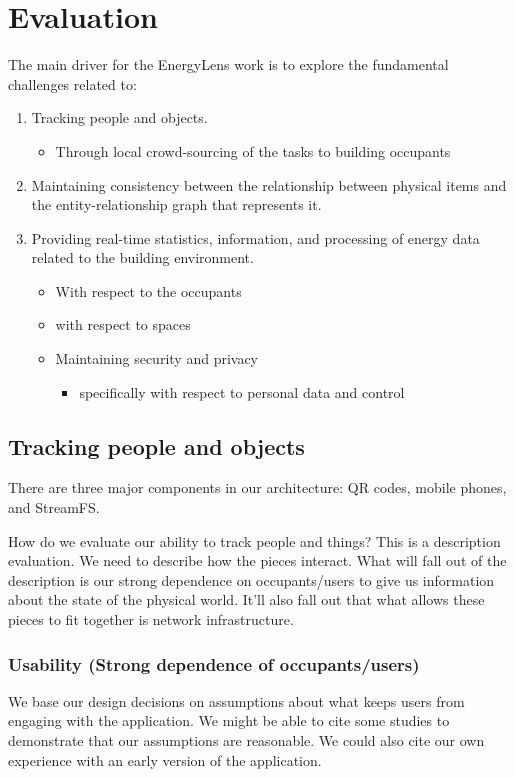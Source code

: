 \section{Evaluation}

The main driver for the EnergyLens work is to explore the fundamental challenges related to:

\begin{enumerate}
\item Tracking people and objects.
	\begin{itemize}
	\item Through local crowd-sourcing of the tasks to building occupants
	\end{itemize}
\item Maintaining consistency between the relationship between physical items and the entity-relationship graph that represents it.
\item Providing real-time statistics, information, and processing of energy data related to the building environment.

	\begin{itemize}
	\item With respect to the occupants
	\item with respect to spaces
	\item Maintaining security and privacy
		\begin{itemize}
		\item specifically with respect to personal data and control
		\end{itemize}
	\end{itemize}

\end{enumerate}

\subsection{Tracking people and objects}
There are three major components in our architecture: QR codes, mobile phones, and StreamFS.

How do we evaluate our ability to track people and things?
This is a description evaluation.  We need to describe how the pieces interact.  What will fall out of the description is our strong dependence on occupants/users to give us information about the state of the physical world.  It’ll also fall out that what allows these pieces to fit together is network infrastructure.

\subsubsection{Usability (Strong dependence of occupants/users)}
We base our design decisions on assumptions about what keeps users from engaging with the application.  We might be able to cite some studies to demonstrate that our assumptions are reasonable.  We could also cite our own experience with an early version of the application.

